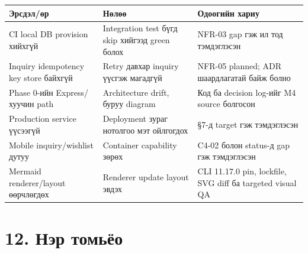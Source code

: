 \documentclass[
  mongolian,
]{article}
\begin{document}
\begin{longtable}[]{@{}
  >{\raggedright\arraybackslash}p{}
  >{\raggedright\arraybackslash}p{}
  >{\raggedright\arraybackslash}p{}@{}}
\toprule\noalign{}
\begin{minipage}[b]{\linewidth}\raggedright
Эрсдэл/өр
\end{minipage} & \begin{minipage}[b]{\linewidth}\raggedright
Нөлөө
\end{minipage} & \begin{minipage}[b]{\linewidth}\raggedright
Одоогийн хариу
\end{minipage} \\
\midrule\noalign{}
\endhead
\bottomrule\noalign{}
\endlastfoot
CI local DB provision хийхгүй & Integration test бүгд skip хийгээд green
болох & NFR-03 gap гэж ил тод тэмдэглэсэн \\
Inquiry idempotency key store байхгүй & Retry давхар inquiry үүсгэж
магадгүй & NFR-05 planned; ADR шаардлагатай байж болно \\
Phase 0-ийн Express/хуучин path & Architecture drift, буруу diagram &
Код ба decision log-ийг M4 source болгосон \\
Production service үүсээгүй & Deployment зураг нотолгоо мэт ойлгогдох &
§7-д target гэж тэмдэглэсэн \\
Mobile inquiry/wishlist дутуу & Container capability зөрөх & C4-02 болон
status-д gap гэж тэмдэглэсэн \\
Mermaid renderer/layout өөрчлөгдөх & Renderer update layout эвдэх & CLI
11.17.0 pin, lockfile, SVG diff ба targeted visual QA \\
\end{longtable}

\section{12. Нэр
томьёо}\label{ux43dux44dux440-ux442ux43eux43cux44cux451ux43e}
\end{document}
